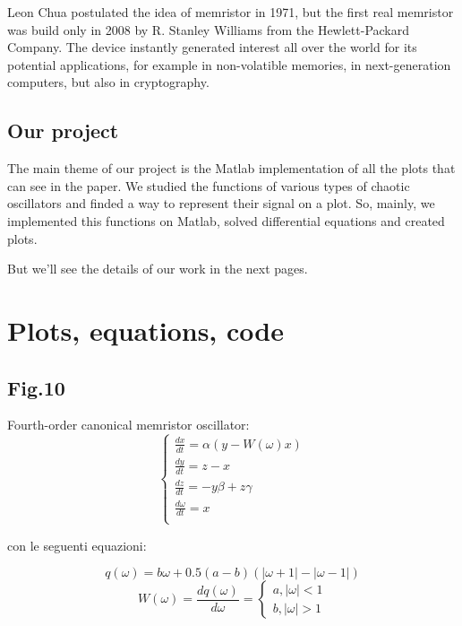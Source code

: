 \documentclass[12pt, a4paper]{book}
\begin{document}
Leon Chua postulated the idea of memristor in 1971, but the first real memristor
was build only in 2008 by R. Stanley Williams from the Hewlett-Packard Company.
The device instantly generated interest all over the world for its potential
applications, for example in non-volatible memories, in next-generation computers,
but also in cryptography.

\subsection{Our project}

The main theme of our project is the Matlab implementation of all the plots that
can see in the paper.
We studied the functions of various types of chaotic oscillators and finded a way
to represent their signal on a plot.
So, mainly, we implemented this functions on Matlab, solved differential 
equations and created plots.

But we'll see the details of our work in the next pages.

\section{Plots, equations, code}
\subsection{Fig.10}
Fourth-order canonical memristor oscillator:
\begin{equation}
\begin{cases}
\frac{dx}{dt}=\alpha(y-W(\omega)x)
\\
\frac{dy}{dt}=z-x
\\
\frac{dz}{dt}=-y\beta+z\gamma
\\
\frac{d\omega}{dt}=x
\\
\end{cases}
\end{equation}

con le seguenti equazioni:

\begin{equation}
q(\omega)=b\omega+0.5(a-b)(|\omega+1|-|\omega-1|)
\end{equation}
\begin{equation}
W(\omega)=\frac{dq(\omega)}{d\omega}=
\begin{cases}
a, |\omega|<1
\\
b, |\omega|>1
\end{cases}
\end{equation}
\end{document}
